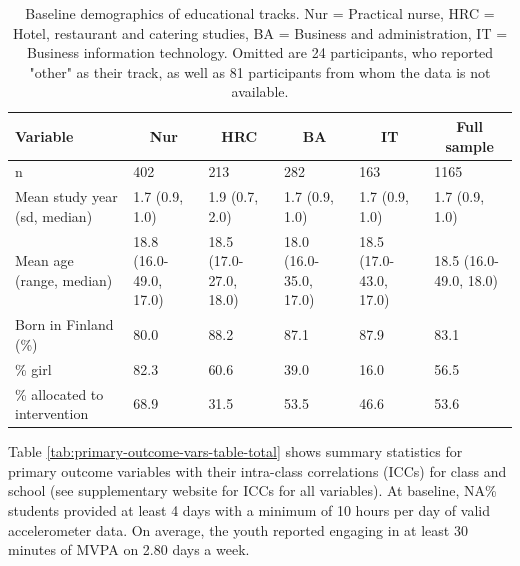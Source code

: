 \documentclass[english,floatsintext,]{apa6}
\theoremstyle{definition}
\theoremstyle{definition}
\theoremstyle{definition}
\theoremstyle{remark}
\begin{document}
\begin{table}[tbp]
\begin{center}
\begin{threeparttable}
\caption{\label{tab:demographics-table}Baseline demographics of educational tracks. Nur = Practical nurse, HRC = Hotel, restaurant and catering studies, BA = Business and administration, IT = Business information technology. Omitted are 24 participants, who reported "other" as their track, as well as 81 participants from whom the data is not available.}
\begin{tabular}{llllll}
\toprule
Variable & \multicolumn{1}{c}{Nur} & \multicolumn{1}{c}{HRC} & \multicolumn{1}{c}{BA} & \multicolumn{1}{c}{IT} & \multicolumn{1}{c}{Full sample}\\
\midrule
n & 402 & 213 & 282 & 163 & 1165\\
Mean study year (sd, median) & 1.7 (0.9, 1.0) & 1.9 (0.7, 2.0) & 1.7 (0.9, 1.0) & 1.7 (0.9, 1.0) & 1.7 (0.9, 1.0)\\
Mean age (range, median) & 18.8 (16.0-49.0, 17.0) & 18.5 (17.0-27.0, 18.0) & 18.0 (16.0-35.0, 17.0) & 18.5 (17.0-43.0, 17.0) & 18.5 (16.0-49.0, 18.0)\\
Born in Finland (\%) & 80.0 & 88.2 & 87.1 & 87.9 & 83.1\\
\% girl & 82.3 & 60.6 & 39.0 & 16.0 & 56.5\\
\% allocated to intervention & 68.9 & 31.5 & 53.5 & 46.6 & 53.6\\
\bottomrule
\end{tabular}
\end{threeparttable}
\end{center}
\end{table}

Table \ref{tab:primary-outcome-vars-table-total} shows summary
statistics for primary outcome variables with their intra-class
correlations (ICCs) for class and school (see supplementary website for
ICCs for all variables). At baseline, NA\% students provided at least 4
days with a minimum of 10 hours per day of valid accelerometer data. On
average, the youth reported engaging in at least 30 minutes of MVPA on
2.80 days a week.
\end{document}
